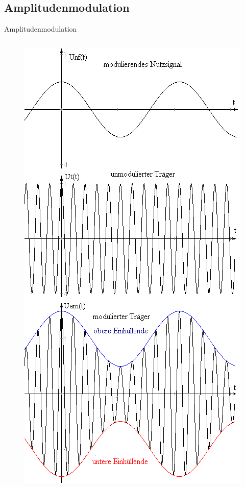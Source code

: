 \subsection[AM]{Amplitudenmodulation}

\begin{frame}{Amplitudenmodulation}
  \begin{columns}[c]
    \begin{figure}
      \includegraphics[width=\textwidth,height=.7\textheight,keepaspectratio]{e14/AM1.png}

\end{figure}
\end{columns}
\end{frame}
